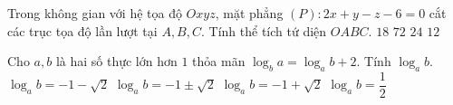 \begin{ex}%
Trong không gian với hệ tọa độ $ Oxyz $, mặt phẳng $ (P) \colon 2x + y - z - 6 = 0 $ cắt các trục tọa độ lần lượt tại $ A, B, C $. Tính thể tích tứ diện  $ OABC $.	
	\choice
	{\True $ 18 $}
	{$ 72 $}
	{$ 24 $}
	{$ 12 $}
\end{ex}
\begin{ex}%
Cho $ a, b  $ là hai số thực lớn hơn $ 1 $ thỏa mãn $ \log_b a = \log_a b + 2 $. Tính $ \log_a b $.	
	\choice
	{$ \log_a b = - 1 - \sqrt{2} $}
	{$ \log_a b = - 1 \pm \sqrt{2} $}
	{\True $ \log_a b = - 1 + \sqrt{2} $}
	{$ \log_a b = \dfrac{1}{2} $}
\end{ex}	

